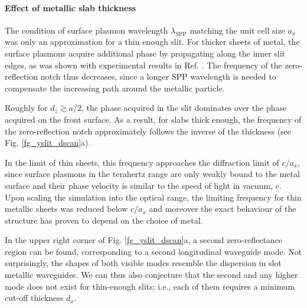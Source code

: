 \paragraph{Effect of metallic slab thickness}%

The condition of surface plasmon wavelength $\lambda_{\text{SPP}}$ matching the unit cell size $a_x$ was only an approximation for a thin enough slit. For thicker sheets of metal, the surface plasmons acquire additional phase by propagating along the inner slit edges, as was shown with experimental results in Ref. \cite{weiner2011electromagnetics}. The frequency of the zero-reflection notch thus decreases, since a longer SPP wavelength is needed to compensate the increasing path around the metallic particle. 

Roughly for $d_z \gtrsim a/2$, the phase acquired in the slit dominates over the phase acquired on the front surface. As a result, 
for slabs thick enough, the frequency of the zero-reflection notch approximately follows the inverse of the thickness (see Fig. \ref{fg_yslit_dscan}a). 

In the limit of thin sheets, this frequency approaches the diffraction limit of $c/a_x$, since surface plasmons in the terahertz range are only weakly bound to the metal surface and their phase velocity is similar to the speed of light in vacuum, $c$. Upon scaling the simulation into the optical range, the limiting frequency for thin metallic sheets was reduced below $c/a_x$ and moreover the exact behaviour of the structure has proven to depend on the choice of metal.

In the upper right corner of Fig. \ref{fg_yslit_dscan}a, a second zero-reflectance region can be found, corresponding to a second longitudinal waveguide mode. Not surprisingly, the shapes of both visible modes resemble the dispersion in slot metallic waveguides. We can thus also conjecture that the second and any higher mode does not exist for thin-enough slits; i.e., each of them requires a minimum cut-off thickness $d_x$.

